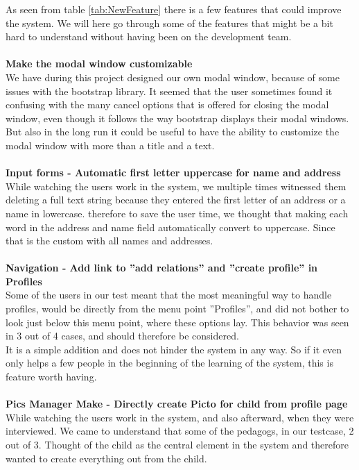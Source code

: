 As seen from table \ref{tab:NewFeature} there is a few features that could improve the system. We will here go through some of the features that might be a bit hard to understand without having been on the development team.\\
\\
\textbf{Make the modal window customizable}\\
We have during this project designed our own modal window, because of some issues with the bootstrap library. It seemed that the user sometimes found it confusing with the many cancel options that is offered for closing the modal window, even though it follows the way bootstrap displays their modal windows.\\
But also in the long run it could be useful to have the ability to customize the modal window with more than a title and a text.\\
\\
\textbf{Input forms - Automatic first letter uppercase for name and address}\\
While watching the users work in the system, we multiple times witnessed them deleting a full text string because they entered the first letter of an address or a name in lowercase. therefore to save the user time, we thought that making each word in the address and name field automatically convert to uppercase. Since that is the custom with all names and addresses.\\
\\
\textbf{Navigation - Add link to ''add relations'' and ''create profile'' in Profiles}\\
Some of the users in our test meant that the most meaningful way to handle profiles, would be directly from the menu point ''Profiles'', and did not bother to look just below this menu point, where these options lay. This behavior was seen in 3 out of 4 cases, and should therefore be considered.\\
It is a simple addition and does not hinder the system in any way. So if it even only helps a few people in the beginning of the learning of the system, this is feature worth having.\\
\\
\textbf{Pics Manager Make - Directly create Picto for child from profile page}\\
While watching the users work in the system, and also afterward, when they were interviewed. We came to understand that some of the pedagogs, in our testcase, 2 out of 3. Thought of the child as the central element in the system and therefore wanted to create everything out from the child.\\
